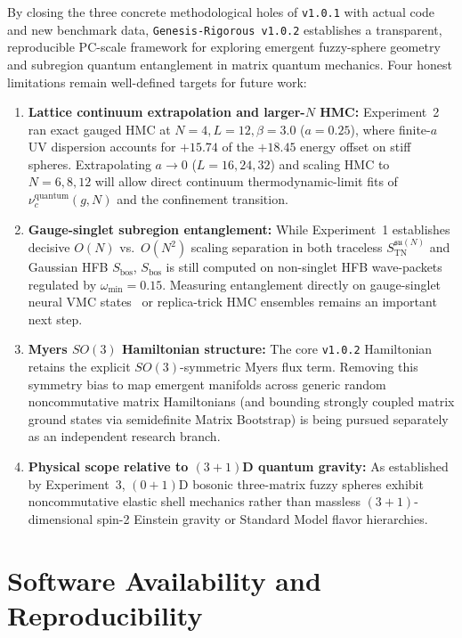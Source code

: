 \documentclass[11pt,a4paper]{article}
\begin{document}
By closing the three concrete methodological holes of \texttt{v1.0.1} with actual code and new benchmark data, \texttt{Genesis-Rigorous v1.0.2} establishes a transparent, reproducible PC-scale framework for exploring emergent fuzzy-sphere geometry and subregion quantum entanglement in matrix quantum mechanics. Four honest limitations remain well-defined targets for future work:
\begin{enumerate}
  \item \textbf{Lattice continuum extrapolation and larger-$N$ HMC:} Experiment~2 ran exact gauged HMC at $N=4, L=12, \beta=3.0$ ($a=0.25$), where finite-$a$ UV dispersion accounts for $+15.74$ of the $+18.45$ energy offset on stiff spheres. Extrapolating $a \to 0$ ($L=16, 24, 32$) and scaling HMC to $N=6, 8, 12$ will allow direct continuum thermodynamic-limit fits of $\nu_c^{\mathrm{quantum}}(g, N)$ and the confinement transition.
  \item \textbf{Gauge-singlet subregion entanglement:} While Experiment~1 establishes decisive $O(N)$ vs.\ $O(N^2)$ scaling separation in both traceless $S_{\mathrm{TN}}^{\mathfrak{su}(N)}$ and Gaussian HFB $S_{\mathrm{bos}}$, $S_{\mathrm{bos}}$ is still computed on non-singlet HFB wave-packets regulated by $\omega_{\min}=0.15$. Measuring entanglement directly on gauge-singlet neural VMC states~\cite{Han2020} or replica-trick HMC ensembles remains an important next step.
  \item \textbf{Myers $SO(3)$ Hamiltonian structure:} The core \texttt{v1.0.2} Hamiltonian retains the explicit $SO(3)$-symmetric Myers flux term. Removing this symmetry bias to map emergent manifolds across generic random noncommutative matrix Hamiltonians (and bounding strongly coupled matrix ground states via semidefinite Matrix Bootstrap) is being pursued separately as an independent research branch.
  \item \textbf{Physical scope relative to $(3+1)$D quantum gravity:} As established by Experiment~3, $(0+1)$D bosonic three-matrix fuzzy spheres exhibit noncommutative elastic shell mechanics rather than massless $(3+1)$-dimensional spin-2 Einstein gravity or Standard Model flavor hierarchies.
\end{enumerate}

\section{Software Availability and Reproducibility}
\label{sec:repro}
\end{document}
